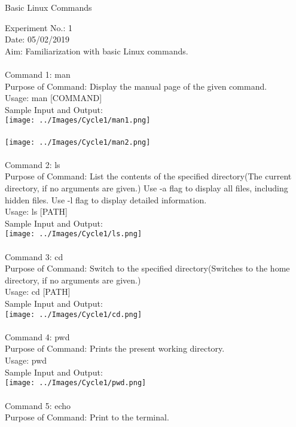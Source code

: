 \documentclass[10pt,a4paper]{report}
\begin{document}
\begin{center}
\begin{Large}
Basic Linux Commands
\end{Large}
\end{center}
Experiment No.: 1\\
Date: 05/02/2019\\
Aim: Familiarization with basic Linux commands.\\
\\
Command 1: man\\
Purpose of Command: Display the manual page of the given command.\\
Usage: man [COMMAND]\\
Sample Input and Output: \\	
\texttt{[image: ../Images/Cycle1/man1.png]}\\
\\
\texttt{[image: ../Images/Cycle1/man2.png]}\\
\\
Command 2: ls\\
Purpose of Command: List the contents of the specified directory(The current directory, if no arguments are given.) Use -a flag to display all files, including hidden files. Use -l flag to display detailed information.\\
Usage: ls [PATH]\\
Sample Input and Output: \\
\texttt{[image: ../Images/Cycle1/ls.png]}\\
\pagebreak
\\
Command 3: cd\\
Purpose of Command: Switch to the specified directory(Switches to the home directory, if no arguments are given.)\\
Usage: cd [PATH]\\
Sample Input and Output: \\
\texttt{[image: ../Images/Cycle1/cd.png]}\\
\\
Command 4: pwd\\
Purpose of Command: Prints the present working directory.\\
Usage: pwd\\
Sample Input and Output: \\
\texttt{[image: ../Images/Cycle1/pwd.png]}\\
\\
Command 5: echo\\
Purpose of Command: Print to the terminal.\\
\end{document}
